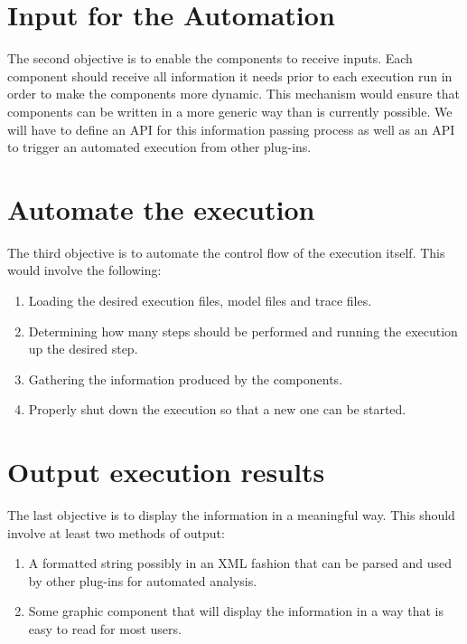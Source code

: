 \section{Input for the Automation}
\label{section:AutoTaskInput}
The second objective is to enable the components to receive inputs.
Each component should receive all information it needs prior to each execution
run in order to make the components more dynamic. This mechanism would ensure
that components can be written in a more generic way than is currently possible.
We will have to define an \ac{API} for this information passing process as well as
an \ac{API} to trigger an automated execution from other plug-ins.


\section{Automate the execution}
\label{section:AutoTaskExecution}
The third objective is to automate the control flow of the execution itself. This would
involve the following:
\begin{enumerate}
  \item Loading the desired execution files, model files and trace files.
  \item Determining how many steps should be performed and running the execution up the desired step.
  \item Gathering the information produced by the components.
  \item Properly shut down the execution so that a new one can be started.
\end{enumerate}


\section{Output execution results}
\label{section:AutoTaskOutput}
The last objective is to display the information in a meaningful way.
This should involve at least two methods of output:
\begin{enumerate}
  \item A formatted string possibly in an XML fashion that can be parsed and
  used by other plug-ins for automated analysis.
  \item Some graphic component that will display the information in a way that is
  easy to read for most users.
\end{enumerate}


